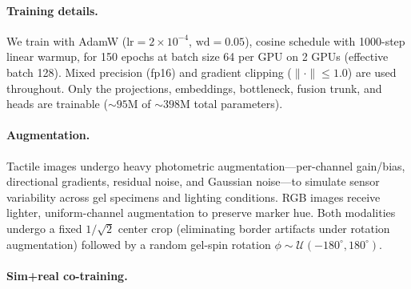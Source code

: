 \paragraph{Training details.}
We train with AdamW ($\text{lr}{=}2 \times 10^{-4}$,
$\text{wd}{=}0.05$), cosine schedule with 1000-step linear warmup, for 150
epochs at batch size 64 per GPU on 2 GPUs (effective batch 128). Mixed
precision (fp16) and gradient clipping ($\|\cdot\| \leq 1.0$) are used
throughout. Only the projections, embeddings, bottleneck, fusion trunk, and
heads are trainable (${\sim}95$M of ${\sim}398$M total parameters).

\paragraph{Augmentation.}
Tactile images undergo heavy photometric augmentation---per-channel gain/bias,
directional gradients, residual noise, and Gaussian noise---to simulate sensor
variability across gel specimens and lighting conditions. RGB images receive
lighter, uniform-channel augmentation to preserve marker hue. Both modalities
undergo a fixed $1/\sqrt{2}$ center crop (eliminating border artifacts under
rotation augmentation) followed by a random gel-spin rotation
$\phi \sim \mathcal{U}(-180^{\circ}, 180^{\circ})$.

\paragraph{Sim+real co-training.}
